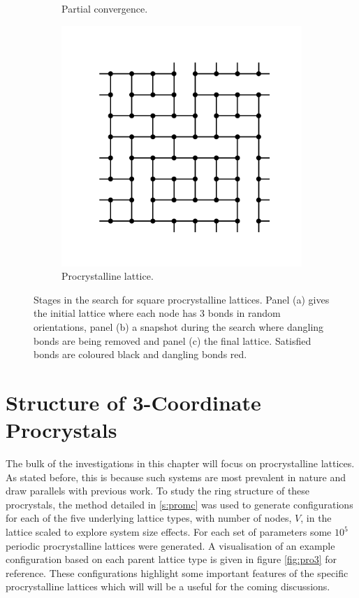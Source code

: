 \begin{figure}[bt]
\begin{subfigure}[b]{0.3\textwidth}
         \caption{Partial convergence.}
         \label{fig:promcb}
     \end{subfigure}
     \hfill
     \begin{subfigure}[b]{0.3\textwidth}
         \centering
         \includegraphics[width=\textwidth]{./figures/procrystals/pro_mc_4.pdf}
         \caption{Procrystalline lattice.}
         \label{fig:promcc}
     \end{subfigure}
     \hfill
     
     \caption{Stages in the \mc{} search for square procrystalline lattices. Panel (a) gives the initial lattice where each node has 3 bonds in random orientations, panel (b) a snapshot during the search where dangling bonds are being removed and panel (c) the final lattice. Satisfied bonds are coloured black and dangling bonds red.}
     \label{fig:promc}
\end{figure}

\section{Structure of 3\--Coordinate Procrystals}
\label{s:pro3}

The bulk of the investigations in this chapter will focus on procrystalline lattices. 
As stated before, this is because such systems are most prevalent in nature and draw parallels with previous work. 
To study the ring structure of these procrystals, the \mc{} method detailed in \ref{s:promc} was used to generate configurations for each of the five underlying lattice types, with number of nodes, $V$, in the lattice scaled to explore system size effects.
For each set of parameters some $10^5$ periodic procrystalline lattices were generated.
A visualisation of an example configuration based on each parent lattice type is given in figure \ref{fig:pro3} for reference. 
These configurations highlight some important features of the specific procrystalline lattices which will will be a useful for the coming discussions.

